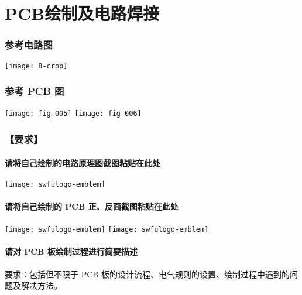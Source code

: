 \documentclass{swfulabreport}
\begin{document}
\chapter{PCB绘制及电路焊接}

\subsection{参考电路图}

\begin{center}
  \texttt{[image: 8-crop]}
\end{center}

\subsection{参考 PCB 图}

\begin{center}
  \texttt{[image: fig-005]}\quad
  \texttt{[image: fig-006]}
\end{center}

\subsection{【要求】}

\subsubsection{请将自己绘制的电路原理图截图粘贴在此处}

\begin{center}
  \texttt{[image: swfulogo-emblem]}
\end{center}

\subsubsection{请将自己绘制的 PCB 正、反面截图粘贴在此处}

\begin{center}
  \texttt{[image: swfulogo-emblem]}\qquad
  \texttt{[image: swfulogo-emblem]}
\end{center}

\subsubsection{请对 PCB 板绘制过程进行简要描述}

要求：包括但不限于 PCB 板的设计流程、电气规则的设置、绘制过程中遇到的问
题及解决方法。
\end{document}

